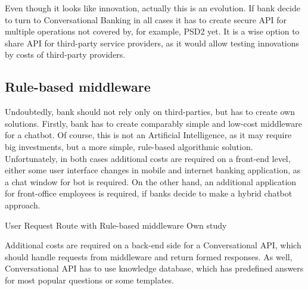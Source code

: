 Even though it looks like innovation, actually this is an evolution.
If bank decide to turn to Conversational Banking in all cases it has to create secure API for multiple operations not covered by, for example, PSD2 yet.
It is a wise option to share API for third-party service providers, as it would allow testing innovations by costs of third-party providers.


\subsection{Rule-based middleware}

Undoubtedly, bank should not rely only on third-parties, but has to create own solutions.
Firstly, bank has to create comparably simple and low-cost middleware for a chatbot.
Of course, this is not an Artificial Intelligence, as it may require big investments, but a more simple, rule-based algorithmic solution.
Unfortunately, in both cases additional costs are required on a front-end level, either some user interface changes in mobile and internet banking application, as a chat window for bot is required.
On the other hand, an additional application for front-office employees is required, if banks decide to make a hybrid chatbot approach.

\mttable
{User Request Route with Rule-based middleware}
{Own study}
{
}

Additional costs are required on a back-end side for a Conversational API, which should handle requests from middleware and return formed responses.
As well, Conversational API has to use knowledge database, which has predefined answers for most popular questions or some templates.



